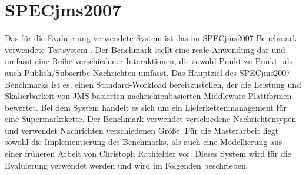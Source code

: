 
\section{SPECjms2007}
\label{sec:specjms}
Das für die Evaluierung verwendete System ist das im SPECjms2007 Benchmark verwendete Testsystem \cite{Sachs2013}. Der Benchmark stellt eine reale Anwendung dar und umfasst eine Reihe verschiedener Interaktionen, die sowohl Punkt-zu-Punkt- als auch Publish/Subscribe-Nachrichten umfasst. Das Hauptziel des SPECjms2007 Benchmarks ist es, einen Standard-Workload bereitzustellen, der die Leistung und Skalierbarkeit von JMS-basierten nachrichtenbasierten Middleware-Plattformen bewertet. Bei dem System handelt es sich um ein Lieferkettenmanagement für eine Supermarktkette. Der Benchmark verwendet verschiedene Nachrichtentypen und verwendet Nachrichten verschiedenen Größe. Für die Masterarbeit liegt sowohl die Implementierung des Benchmarks, als auch eine Modellierung aus einer früheren Arbeit von Christoph Rathfelder \cite{Rathfelder2013} vor. Dieses System wird für die Evaluierung verwendet werden und wird im Folgenden beschrieben. 

